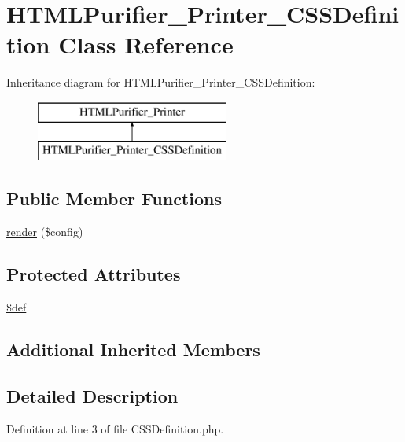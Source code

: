 \hypertarget{classHTMLPurifier__Printer__CSSDefinition}{\section{H\+T\+M\+L\+Purifier\+\_\+\+Printer\+\_\+\+C\+S\+S\+Definition Class Reference}
\label{classHTMLPurifier__Printer__CSSDefinition}
}
Inheritance diagram for H\+T\+M\+L\+Purifier\+\_\+\+Printer\+\_\+\+C\+S\+S\+Definition\+:\begin{figure}[H]
\begin{center}
\leavevmode
\includegraphics[height=2.000000cm]{classHTMLPurifier__Printer__CSSDefinition}
\end{center}
\end{figure}
\subsection*{Public Member Functions}
\begin{DoxyCompactItemize}
\item 
\hyperlink{classHTMLPurifier__Printer__CSSDefinition_a882b371494a8504174f2f9c9e12e05a7}{render} (\$config)
\end{DoxyCompactItemize}
\subsection*{Protected Attributes}
\begin{DoxyCompactItemize}
\item 
\hyperlink{classHTMLPurifier__Printer__CSSDefinition_ab17c9bfde2e134d667f852068d8c7952}{\$def}
\end{DoxyCompactItemize}
\subsection*{Additional Inherited Members}


\subsection{Detailed Description}


Definition at line 3 of file C\+S\+S\+Definition.\+php.



